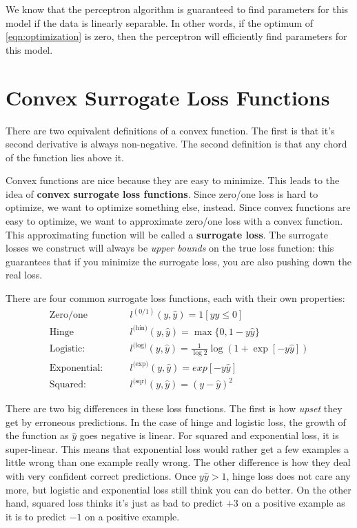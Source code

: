 We know that the perceptron algorithm is guaranteed to find parameters for this model if the data is linearly separable. In other words, if the optimum of \ref{eqn:optimization} is zero, then the perceptron will efficiently find parameters for this model.

\section{Convex Surrogate Loss Functions}
There are two equivalent definitions of a convex function. The first is that it's second derivative is always non-negative. The second definition is that any chord of the function lies above it.

Convex functions are nice because they are easy to minimize. This leads to the idea of \textbf{convex surrogate loss functions}. Since zero/one loss is hard to optimize, we want to optimize something else, instead. Since convex functions are easy to optimize, we want to approximate zero/one loss with a convex function. This approximating function will be called a \textbf{surrogate loss}. The surrogate losses we construct will always be \emph{upper bounds} on the true loss function: this guarantees that if you minimize the surrogate loss, you are also pushing down the real loss.

There are four common surrogate loss functions, each with their own properties:
\begin{align}
    \text{Zero/one}& \qquad l^{(0/1)}(y,\hat{y}) = 1[y\hat{y} \leq 0] \\
    \text{Hinge}& \qquad l^\text{(hin)}(y,\hat{y}) = \max\{0,1-y\hat{y}\} \\
    \text{Logistic:}& \qquad l^\text{(log)}(y,\hat{y}) = \frac 1 {\log 2} \log (1 + \exp [-y\hat{y}]) \\
    \text{Exponential:}& \qquad l^\text{(exp)}(y,\hat{y}) = exp[-y\hat{y}] \\
    \text{Squared:}& \qquad l^\text{(sqr)}(y,\hat{y}) = (y-\hat{y})^2
\end{align}

There are two big differences in these loss functions. The first is how \emph{upset} they get by erroneous predictions. In the case of hinge and logistic loss, the growth of the function as \(\hat{y}\) goes negative is linear. For squared and exponential loss, it is super-linear. This means that exponential loss would rather get a few examples a little wrong than one example really wrong.
The other difference is how they deal with very confident correct predictions. Once \(y\hat{y}>1\), hinge loss does not care any more, but logistic and exponential loss still think you can do better. On the other hand, squared loss thinks it's just as bad to predict \(+3\) on a positive example as it is to predict \(-1\) on a positive example.

